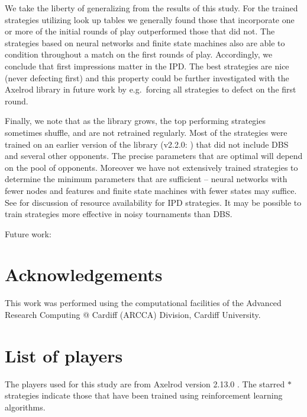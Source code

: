 \documentclass{article}
\begin{document}
We take the liberty of generalizing from the results of this study. For the trained
strategies utilizing look up tables we generally found those that incorporate
one or more of the initial rounds of play outperformed those that did not. The
strategies based on neural networks and finite state machines also are able to
condition throughout a match on the first rounds of play. Accordingly, we conclude
that first impressions matter in the IPD\@. The best strategies are nice (never
defecting first) and this property could be further investigated with the
Axelrod library
in future work by e.g.\ forcing all strategies to defect on the first round.

Finally, we note that as the library grows, the top performing strategies
sometimes shuffle, and are not retrained regularly. Most of the strategies were
trained on an earlier version of the library (v2.2.0: \cite{axelrodproject2.2})
that did not include DBS and several other opponents. The precise parameters
that are optimal will depend on the pool of opponents. Moreover we have not
extensively trained strategies to determine the minimum parameters that are
sufficient -- neural networks with fewer nodes and features and finite state
machines with fewer states may suffice. See \cite{ashlock2013impact} for
discussion of resource availability for IPD strategies. It may be possible to
train strategies more effective in noisy tournaments than DBS.

Future work:


\section*{Acknowledgements}

This work was performed using the computational facilities of the Advanced
Research Computing @ Cardiff (ARCCA) Division, Cardiff University.

\printbibliography

\appendix

\section{List of players}\label{app:list_of_players}

The players used for this study are from Axelrod version 2.13.0
\cite{axelrodproject}. The starred $*$
strategies indicate those that have been trained using reinforcement learning
algorithms.

\begin{multicols}{2}
	\begin{enumerate}
		
	\end{enumerate}
\end{multicols}
\end{document}
